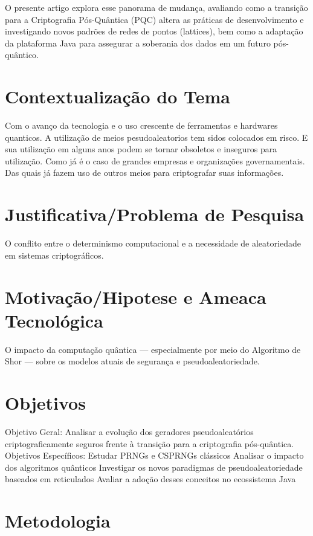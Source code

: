 \documentclass[
	12pt,				%
	openright,			%
	oneside,			%
	a4paper,			%
	portuguese,			%
	brazil				%
	]{abntex2}
\begin{document}
O presente artigo explora esse panorama de mudança, avaliando como a transição para a Criptografia Pós-Quântica (PQC) altera as práticas de desenvolvimento e investigando novos padrões de redes de pontos (lattices), 
bem como a adaptação da plataforma Java para assegurar a soberania dos dados em um futuro pós-quântico.

\section{Contextualização do Tema}

Com o avanço da tecnologia e o uso crescente de ferramentas e hardwares quanticos. 
A utilização de meios pesudoaleatorios tem sidos colocados em risco. 
E sua utilização em alguns anos podem se tornar obsoletos e inseguros para utilização. 
Como já é o caso de grandes empresas e organizações governamentais. 
Das quais já fazem uso de  outros meios para criptografar suas informações. 

\section{Justificativa/Problema de Pesquisa}

O conflito entre o determinismo computacional e a necessidade de aleatoriedade em sistemas criptográficos.

\section{Motivação/Hipotese e Ameaca Tecnológica}

O impacto da computação quântica — especialmente por meio do Algoritmo de Shor — sobre os modelos atuais de segurança e pseudoaleatoriedade.

\section{Objetivos}

Objetivo Geral: Analisar a evolução dos geradores pseudoaleatórios criptograficamente seguros frente à transição para a criptografia pós-quântica.
Objetivos Específicos:
Estudar PRNGs e CSPRNGs clássicos
Analisar o impacto dos algoritmos quânticos
Investigar os novos paradigmas de pseudoaleatoriedade baseados em reticulados
Avaliar a adoção desses conceitos no ecossistema Java


\section{Metodologia}
\end{document}
